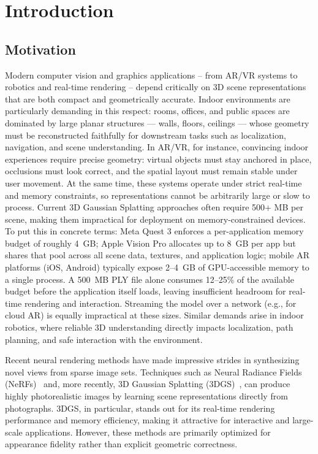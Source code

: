 \chapter{Introduction}


\section{Motivation}

Modern computer vision and graphics applications -- from AR/VR systems to robotics and real-time rendering -- depend critically on 3D scene representations that are both compact and geometrically accurate. Indoor environments are particularly demanding in this respect: rooms, offices, and public spaces are dominated by large planar structures — walls, floors, ceilings — whose geometry must be reconstructed faithfully for downstream tasks such as localization, navigation, and scene understanding. In AR/VR, for instance, convincing indoor experiences require precise geometry: virtual objects must stay anchored in place, occlusions must look correct, and the spatial layout must remain stable under user movement. At the same time, these systems operate under strict real-time and memory constraints, so representations cannot be arbitrarily large or slow to process. Current 3D Gaussian Splatting approaches often require 500+ MB per scene, making them impractical for deployment on memory-constrained devices. To put this in concrete terms: Meta Quest 3 enforces a per-application memory budget of roughly 4~GB; Apple Vision Pro allocates up to 8~GB per app but shares that pool across all scene data, textures, and application logic; mobile AR platforms (iOS, Android) typically expose 2--4~GB of GPU-accessible memory to a single process. A 500~MB PLY file alone consumes 12--25\% of the available budget before the application itself loads, leaving insufficient headroom for real-time rendering and interaction. Streaming the model over a network (e.g., for cloud AR) is equally impractical at these sizes. Similar demands arise in indoor robotics, where reliable 3D understanding directly impacts localization, path planning, and safe interaction with the environment.

Recent neural rendering methods have made impressive strides in synthesizing novel views from sparse image sets. Techniques such as Neural Radiance Fields (NeRFs)~\cite{mildenhall2020nerf} and, more recently, 3D Gaussian Splatting (3DGS)~\cite{kerbl20233dgs}, can produce highly photorealistic images by learning scene representations directly from photographs. 3DGS, in particular, stands out for its real-time rendering performance and memory efficiency, making it attractive for interactive and large-scale applications. However, these methods are primarily optimized for appearance fidelity rather than explicit geometric correctness.

